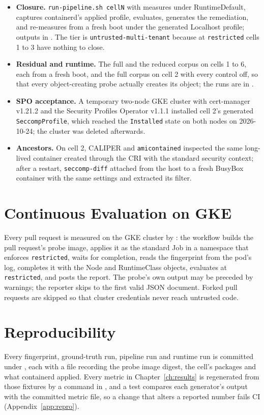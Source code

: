 \begin{itemize}[leftmargin=*]
\item \textbf{Closure.} \texttt{run-pipeline.sh cellN} with  measures under RuntimeDefault, captures containerd's applied profile, evaluates, generates the remediation, and re-measures from a fresh boot under the generated Localhost profile; outputs in . The tier is \texttt{untrusted-multi-tenant} because at \texttt{restricted} cells 1 to 3 have nothing to close.
\item \textbf{Residual and runtime.} The full and the reduced corpus on cells 1 to 6, each from a fresh boot, and the full corpus on cell 2 with every control off, so that every object-creating probe actually creates its object; the runs are in .
\item \textbf{SPO acceptance.} A temporary two-node GKE cluster with cert-manager v1.21.2 and the Security Profiles Operator v1.1.1 installed cell 2's generated \texttt{SeccompProfile}, which reached the \texttt{Installed} state on both nodes on 2026-10-24; the cluster was deleted afterwards.
\item \textbf{Ancestors.} On cell 2, CALIPER and \texttt{amicontained} inspected the same long-lived container created through the CRI with the standard security context; after a restart, \texttt{seccomp-diff} attached from the host to a fresh BusyBox container with the same settings and extracted its filter.
\end{itemize}

\section{Continuous Evaluation on GKE}

Every pull request is measured on the GKE cluster by : the workflow builds the pull request's probe image, applies it as the standard Job in a namespace that enforces \texttt{restricted}, waits for completion, reads the fingerprint from the pod's log, completes it with the Node and RuntimeClass objects, evaluates at \texttt{restricted}, and posts the report. The probe's own output may be preceded by warnings; the reporter skips to the first valid JSON document. Forked pull requests are skipped so that cluster credentials never reach untrusted code.

\section{Reproducibility}

Every fingerprint, ground-truth run, pipeline run and runtime run is committed under , each with a  file recording the probe image digest, the cell's packages and what containerd applied. Every metric in Chapter~\ref{ch:results} is regenerated from those fixtures by a command in , and a test compares each generator's output with the committed metric file, so a change that alters a reported number fails CI (Appendix~\ref{app:repro}).
